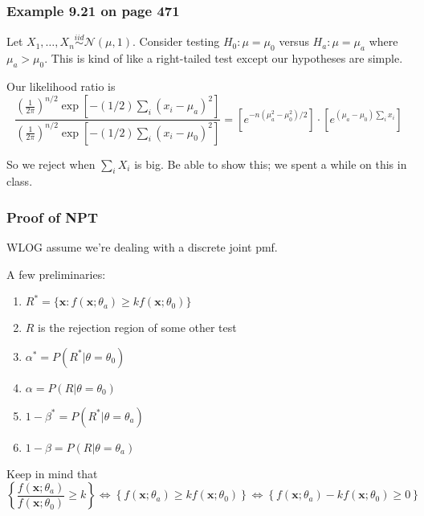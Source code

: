 \documentclass{beamer}
\begin{document}
\begin{frame}
\frametitle{Example 9.21 on page 471}

Let $X_1, \ldots, X_n \overset{iid}{\sim} \mathcal{N}(\mu, 1)$. Consider testing $H_0: \mu = \mu_0$ versus $H_a: \mu = \mu_a$ where $\mu_a > \mu_0$. This is kind of like a right-tailed test except our hypotheses are simple.
\newline

Our likelihood ratio is 
\[
\frac{(\frac{1}{2\pi})^{n/2} \exp\left[-(1/2) \sum_i (x_i - \mu_a)^2 \right] }{(\frac{1}{2\pi})^{n/2} \exp\left[-(1/2) \sum_i (x_i - \mu_0)^2 \right] } = \left[e^{-n(\mu_a^2 - \mu_0^2)/2} \right] \cdot \left[ e^{(\mu_a - \mu_0) \sum_i x_i} \right]
\]

So we reject when $\sum_i X_i$ is big. Be able to show this; we spent a while on this in class.
\end{frame}

\begin{frame}
\frametitle{Proof of NPT}
WLOG assume we're dealing with a discrete joint pmf. 

A few preliminaries:
\begin{enumerate}
\item $R^* = \{ \mathbf{x} : f(\mathbf{x} ; \theta_a) \ge k f(\mathbf{x} ; \theta_0)\}$
\item $R$ is the rejection region of some other test
\item $\alpha^* = P(R^* | \theta = \theta_0)$
\item $\alpha = P(R | \theta = \theta_0)$
\item $1 - \beta^* = P(R^*| \theta = \theta_a) $
\item $1 - \beta = P(R| \theta = \theta_a) $
\end{enumerate}

Keep in mind that 
\[
\left\{ \frac{f(\mathbf{x} ; \theta_a)}{f(\mathbf{x} ; \theta_0)} \ge k \right\} \Leftrightarrow \left\{ f(\mathbf{x} ; \theta_a) \ge k f(\mathbf{x} ; \theta_0) \right\} \Leftrightarrow \left\{ f(\mathbf{x} ; \theta_a) - k f(\mathbf{x} ; \theta_0) \ge 0 \right\}
\]

\end{frame}
\end{document}

